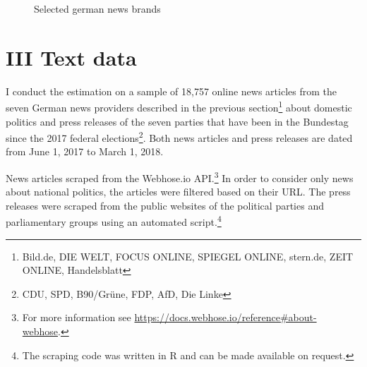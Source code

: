 \documentclass[
]{article}
\begin{document}
\begin{figure}

{\centering {}

}

\caption{Selected german news brands \label{fig:news_market}}\label{fig:unnamed-chunk-1}
\end{figure}

\hypertarget{iii-text-data}{%
\section{III Text data}\label{iii-text-data}}

I conduct the estimation on a sample of 18,757 online news articles from
the seven German news providers described in the previous
section\footnote{Bild.de, DIE WELT, FOCUS ONLINE, SPIEGEL ONLINE,
  stern.de, ZEIT ONLINE, Handelsblatt} about domestic politics and press
releases of the seven parties that have been in the Bundestag since the
2017 federal elections\footnote{CDU, SPD, B90/Grüne, FDP, AfD, Die Linke}.
Both news articles and press releases are dated from June 1, 2017 to
March 1, 2018.

News articles scraped from the Webhose.io API.\footnote{For more
  information see
  \url{https://docs.webhose.io/reference\#about-webhose}.} In order to
consider only news about national politics, the articles were filtered
based on their URL. The press releases were scraped from the public
websites of the political parties and parliamentary groups using an
automated script.\footnote{The scraping code was written in R and can be
  made available on request.}
\end{document}
